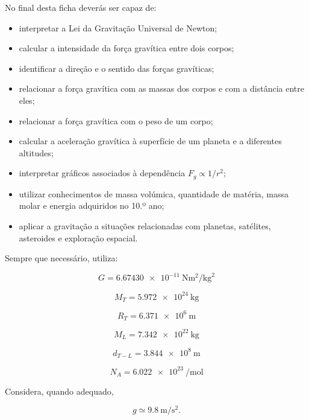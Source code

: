 \documentclass[11pt,a4paper]{article}
\begin{document}
	\begin{objetivos}
		
		No final desta ficha deverás ser capaz de:
		
		\begin{itemize}
			
			\item interpretar a Lei da Gravitação Universal de Newton;
			
			\item calcular a intensidade da força gravítica entre dois corpos;
			
			\item identificar a direção e o sentido das forças gravíticas;
			
			\item relacionar a força gravítica com as massas dos corpos e com a
			distância entre eles;
			
			\item relacionar a força gravítica com o peso de um corpo;
			
			\item calcular a aceleração gravítica à superfície de um planeta e a
			diferentes altitudes;
			
			\item interpretar gráficos associados à dependência
			$F_g\propto 1/r^2$;
			
			\item utilizar conhecimentos de massa volúmica, quantidade de matéria,
			massa molar e energia adquiridos no 10.º ano;
			
			\item aplicar a gravitação a situações relacionadas com planetas,
			satélites, asteroides e exploração espacial.
			
		\end{itemize}
		
	\end{objetivos}
	
	
	\begin{dados}
		
		Sempre que necessário, utiliza:
		
		\[
		G=
		\SI{6.67430e-11}
		{\newton\metre\squared\per\kilogram\squared}
		\]
		
		\[
		M_T=\SI{5.972e24}{\kilogram}
		\]
		
		\[
		R_T=\SI{6.371e6}{\metre}
		\]
		
		\[
		M_L=\SI{7.342e22}{\kilogram}
		\]
		
		\[
		d_{T-L}=\SI{3.844e8}{\metre}
		\]
		
		\[
		N_A=\SI{6.022e23}{\per\mole}
		\]
		
		Considera, quando adequado,
		
		\[
		g\simeq\SI{9.8}{\metre\per\second\squared}.
		\]
		
	\end{dados}
	
\end{document}
